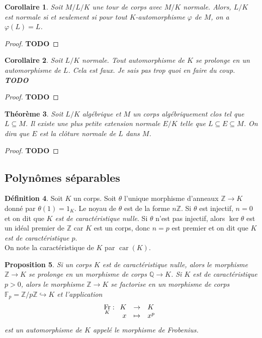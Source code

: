 \documentclass{article}
\newcommand{\Z}{\mathbb{Z}}
\newcommand{\Q}{\mathbb{Q}}
\newcommand{\F}{\mathbb{F}}
\DeclareMathOperator{\car}{car}
\DeclareMathOperator{\Fr}{Fr}
\newcommand{\todo}{\textbf{TODO}}
\newcommand{\applic}[4]{\begin{array}[t]{rcl}
#1 & \to & #2 \\
#3 & \mapsto & #4
\end{array}}
\theoremstyle{plain}
\newtheorem{theorem}{Théorème}[subsection]
\newtheorem{proposition}[theorem]{Proposition}
\newtheorem{corollary}[theorem]{Corollaire}
\theoremstyle{definition}
\newtheorem{definition}[theorem]{Définition}
\theoremstyle{remark}
\begin{document}
\begin{corollary}
    Soit $M/L/K$ une tour de corps avec $M/K$ normale. Alors, $L/K$ est normale si et seulement si pour tout $K$-automorphisme $\varphi$ de $M$, on a $\varphi(L) = L$.
\end{corollary}

\begin{proof}
    \todo
\end{proof}

\begin{corollary}
    Soit $L/K$ normale. Tout automorphisme de $K$ se prolonge en un automorphisme de $L$. Cela est faux. Je sais pas trop quoi en faire du coup. \todo
\end{corollary}

\begin{proof}
    \todo
\end{proof}

\begin{theorem} \label{thmclotnorm}
    Soit $L/K$ algébrique et $M$ un corps algébriquement clos tel que $L \subseteq M$. Il existe une plus petite extension normale $E/K$ telle que $L \subseteq E \subseteq M$. On dira que $E$ est la \emph{clôture normale de $L$ dans $M$}.
\end{theorem}

\begin{proof}
    \todo
\end{proof}

\subsection{Polynômes séparables}

\begin{definition}
    Soit $K$ un corps. Soit $\theta$ l'unique morphisme d'anneaux $\Z \to K$ donné par $\theta(1) = 1_K$. Le noyau de $\theta$ est de la forme $n\Z$. Si $\theta$ est injectif, $n = 0$ et on dit que \emph{$K$ est de caractéristique nulle}. Si $\theta$ n'est pas injectif, alors $\ker \theta$ est un idéal premier de $\Z$ car $K$ est un corps, donc $n = p$ est premier et on dit que \emph{$K$ est de caractéristique $p$}. \\
    On note la caractéristique de $K$ par $\car(K)$.
\end{definition}

\begin{proposition}
    Si un corps $K$ est de caractéristique nulle, alors le morphisme $\Z \to K$ se prolonge en un morphisme de corps $\Q \to K$. Si $K$ est de caractéristique $p > 0$, alors le morphisme $\Z \to K$ se factorise en un morphisme de corps $\F_p = \Z/p\Z \hookrightarrow K$ et l'application
    \[\Fr_K : \applic{K}{K}{x}{x^p}\]
    est un automorphisme de $K$ appelé \emph{le morphisme de Frobenius}.
\end{proposition}
\end{document}
